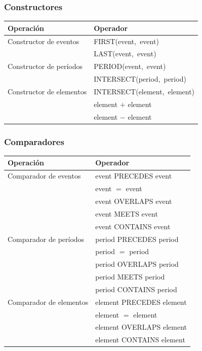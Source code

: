 \documentclass[a4paper,12pt,oneside]{report}
\begin{document}
\subsubsection*{Constructores}
\begin{center}
\begin{tabular}{|l|l|}
\hline
Operaci\'on & Operador\\
\hline
\hline
Constructor de eventos & FIRST(event,\ event)\ \\
& LAST(event,\ event)\\
\hline
Constructor de per\'iodos & PERIOD(event,\ event)\\
& INTERSECT(period,\ period)\\
\hline
Constructor de elementos & INTERSECT(element,\ element)\\
& element $+$ element\\
& element $-$ element\\
\hline
\end{tabular}
\end{center}
\subsubsection*{Comparadores}
\begin{center}
\begin{tabular}{|l|l|}
\hline
Operaci\'on & Operador\\
\hline
\hline
Comparador de eventos & event PRECEDES event\\
& event $=$ event\\
& event OVERLAPS event\\
& event MEETS event\\
& event CONTAINS event\\
\hline
Comparador de per\'iodos & period PRECEDES period\\
& period $=$ period\\
& period OVERLAPS period\\
& period MEETS period\\
& period CONTAINS period\\
\hline
Comparador de elementos & element PRECEDES element\\
& element $=$ element\\
& element OVERLAPS element\\
& element CONTAINS element\\
\hline
\end{tabular}
\end{center}
\end{document}
